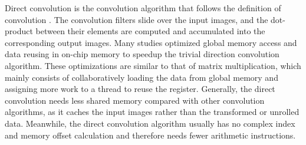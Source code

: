\documentclass{article}
\begin{document}
Direct convolution is the convolution algorithm that follows the definition of convolution \cite{krizhevsky2012cuda}. The convolution filters slide over the input images, and the dot-product between their elements are computed and accumulated into the corresponding output images. Many studies \cite{perrot2016optimized, iandola2013communication, chen2017optimizing, li2015fast} optimized global memory access and data reusing in on-chip memory to speedup the trivial direction convolution algorithm. These optimizations are similar to that of matrix multiplication, which mainly consists of collaboratively loading the data from global memory and assigning more work to a thread to reuse the register. Generally, the direct convolution needs less shared memory compared with other convolution algorithms, as it caches the input images rather than the transformed or unrolled data. Meanwhile, the direct convolution algorithm usually has no complex index and memory offset calculation and therefore needs fewer arithmetic instructions.



\end{document}

